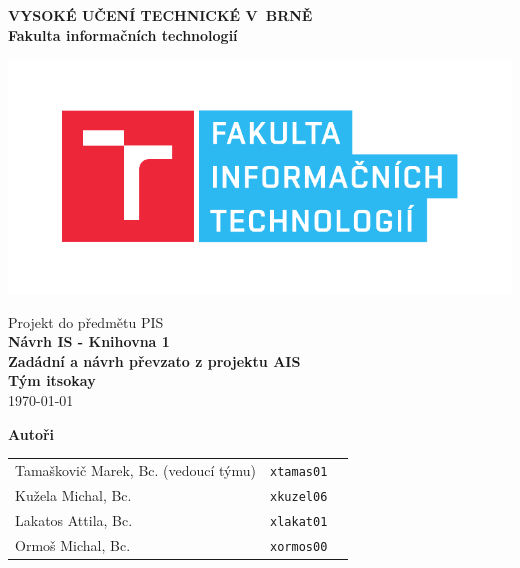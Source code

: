 \begin{titlepage}

    \centering

    {\fontsize{20pt}{15pt}\bfseries
    VYSOKÉ UČENÍ TECHNICKÉ V~BRNĚ\\
    \vspace{8pt}
    Fakulta informačních technologií
    }


    \includegraphics[scale=0.7]{./assets/fit-logo.pdf}

    \vspace{22pt}

    {\Large Projekt do předmětu PIS\\}
    \vspace{4pt}
    {\LARGE \bfseries Návrh IS - Knihovna 1 \\}
    {\Large \bfseries Zadádní a návrh převzato z projektu AIS\\}
    \vspace{90pt}
    {\Large \bfseries Tým itsokay\\}
    \vspace{90pt}
    {\Large \today}

    \vspace{90pt}
    {\Large \bfseries Autoři\\}
    \vspace{12pt}

    \begin{tabular}{ l c r }
        Tamaškovič Marek, Bc. (vedoucí týmu)& \texttt{xtamas01} \\
        Kužela Michal, Bc. & \texttt{xkuzel06} \\
        Lakatos Attila, Bc. &\texttt{xlakat01} \\
        Ormoš Michal, Bc. & \texttt{xormos00} \\
    \end{tabular}\\

\end{titlepage}
